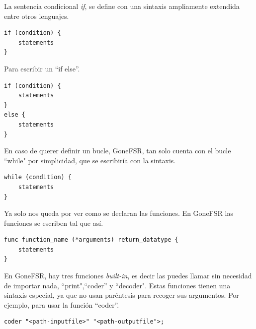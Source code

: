 \noindent La sentencia condicional \textit{if}, se define con  una sintaxis ampliamente extendida entre otros lenguajes.

\begin{lstlisting}[style=goneStyle]
if (condition) {
    statements
}
\end{lstlisting}

\noindent Para escribir un ``if else''.

\begin{lstlisting}[style=goneStyle]
if (condition) {
    statements
}
else {
    statements
}
\end{lstlisting}

\noindent En caso de querer definir un bucle,
GoneFSR, tan solo cuenta con el bucle ``while"  por simplicidad, que se escribiría con la sintaxis.

\begin{lstlisting}[style=goneStyle]
while (condition) {
    statements
}
\end{lstlisting}

\noindent Ya solo nos queda por ver como se declaran las funciones. En GoneFSR las funciones se escriben tal que así.
\begin{lstlisting}[style=goneStyle]
func function_name (*arguments) return_datatype {
    statements
}
\end{lstlisting}
En GoneFSR, hay tres funciones \textit{built-in}, es decir las puedes llamar sin necesidad de importar nada, ``print",``coder'' y ``decoder". Estas funciones tienen una sintaxis especial, ya que no usan paréntesis para recoger sus argumentos. Por ejemplo, para usar la función ``coder''.
\begin{lstlisting}[style=goneStyle]
coder "<path-inputfile>" "<path-outputfile">;
\end{lstlisting}
